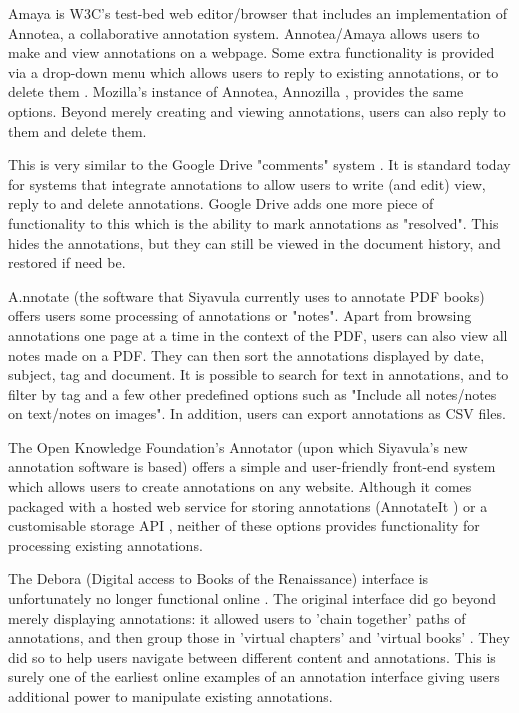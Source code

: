 Amaya \citep{Amaya} is W3C's test-bed web editor/browser that includes an implementation of Annotea, a collaborative annotation system. Annotea/Amaya allows users to make and view annotations on a webpage. Some extra functionality is provided via a drop-down menu which allows users to reply to existing annotations, or to delete them \citep{Annotea}. Mozilla's instance of Annotea, Annozilla \citep{Annozilla}, provides the same options. Beyond merely creating and viewing annotations, users can also reply to them and delete them. 

This is very similar to the Google Drive "comments" system \citep{GDrive}. It is standard today for systems that integrate annotations to allow users to write (and edit) view, reply to and delete annotations. Google Drive adds one more piece of functionality to this which is the ability to mark annotations as "resolved". This hides the annotations, but they can still be viewed in the document history, and restored if need be.

A.nnotate \citep{AnnotateCom} (the software that Siyavula currently uses to annotate PDF books) offers users some processing of annotations or "notes". Apart from browsing annotations one page at a time in the context of the PDF, users can also view all notes made on a PDF. They can then sort the annotations displayed by date, subject, tag and document. It is possible to search for text in annotations, and to filter by tag and a few other predefined options such as "Include all notes/notes on text/notes on images". In addition, users can export annotations as CSV files.

The Open Knowledge Foundation's Annotator (upon which Siyavula's new annotation software is based) \citep{Annotator} offers a simple and user-friendly front-end system which allows users to create annotations on any website. Although it comes packaged with a hosted web service for storing annotations (AnnotateIt \citep{AnnotateIt}) or a customisable storage API \citep{AnnotatorAPI}, neither of these options provides functionality for processing existing annotations.

The Debora (Digital access to Books of the Renaissance) interface \citep{debora} is unfortunately no longer functional online \citep{DeboraLink}. The original interface did go beyond merely displaying annotations: it allowed users to 'chain together' paths of annotations, and then group those in 'virtual chapters' and 'virtual books' \citep[p. 6]{debora}. They did so to help users navigate between different content and annotations. This is surely one of the earliest online examples of an annotation interface giving users additional power to manipulate existing annotations. 


